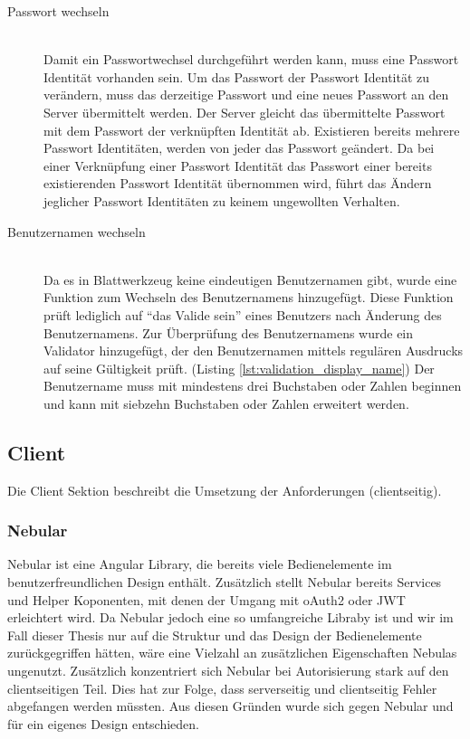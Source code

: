 \begin{description}
	\item[Passwort wechseln]\hfill\\
	Damit ein Passwortwechsel durchgeführt werden kann, muss eine Passwort Identität vorhanden sein. Um das Passwort der Passwort Identität zu verändern, muss das derzeitige Passwort und eine neues Passwort an den Server übermittelt werden. Der Server gleicht das übermittelte Passwort mit dem Passwort der verknüpften Identität ab. Existieren bereits mehrere Passwort Identitäten, werden von jeder das Passwort geändert. Da bei einer Verknüpfung einer Passwort Identität das Passwort einer bereits existierenden Passwort Identität übernommen wird, führt das Ändern jeglicher Passwort Identitäten zu keinem ungewollten Verhalten.
	\item[Benutzernamen wechseln]\hfill\\
	Da es in Blattwerkzeug keine eindeutigen Benutzernamen gibt, wurde eine Funktion zum Wechseln des Benutzernamens hinzugefügt. Diese Funktion prüft lediglich auf \enquote{das Valide sein} eines Benutzers nach Änderung des Benutzernamens. Zur Überprüfung des Benutzernamens wurde ein Validator hinzugefügt, der den Benutzernamen mittels regulären Ausdrucks auf seine Gültigkeit prüft. (Listing \ref{lst:validation_display_name}) Der Benutzername muss mit mindestens drei Buchstaben oder Zahlen beginnen und kann mit siebzehn Buchstaben oder Zahlen erweitert werden.
	
	
\end{description}

\subsection{Client}
\label{sec: client}
Die Client Sektion beschreibt die Umsetzung der Anforderungen (clientseitig).

\subsubsection{Nebular}
\label{sec: nebular}
Nebular ist eine Angular Library, die bereits viele Bedienelemente im benutzerfreundlichen Design enthält. Zusätzlich stellt Nebular bereits Services und Helper Koponenten, mit denen der Umgang mit \gls{oAuth2} oder \gls{JWT} erleichtert wird. Da Nebular jedoch eine so umfangreiche Libraby ist und wir im Fall dieser Thesis nur auf die Struktur und das Design der Bedienelemente zurückgegriffen hätten, wäre eine Vielzahl an zusätzlichen Eigenschaften Nebulas ungenutzt. Zusätzlich konzentriert sich Nebular bei Autorisierung stark auf den clientseitigen Teil. Dies hat zur Folge, dass serverseitig und clientseitig Fehler abgefangen werden müssten. Aus diesen Gründen wurde sich gegen Nebular und für ein eigenes Design entschieden.

